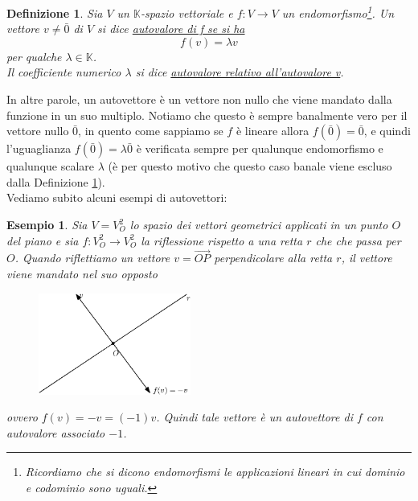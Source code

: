 \documentclass{book}
\newtheorem{definizione}{Definizione}[section]
\newtheorem{esempio}{Esempio}[section]
\begin{document}
\begin{definizione}
  \label{def:5.1.1}
  Sia $V$ un $\mathds{K}$-spazio vettoriale e $f: V\to V$ un endomorfismo\footnote{Ricordiamo che si dicono
    endomorfismi le applicazioni lineari in cui dominio e codominio sono uguali.}. Un vettore $v\neq \bar{0}$ di
  $V$ si dice \underline{autovalore di f se si ha}
  \begin{equation}
    \label{eq:5.1}
    f(v)=\lambda v
  \end{equation}
  per qualche $\lambda \in \mathds{K}$.\\
  Il coefficiente numerico $\lambda$ si dice \underline{autovalore relativo all'autovalore v}.
\end{definizione}
In altre parole, un autovettore è un vettore non nullo che viene mandato dalla funzione in un suo multiplo.
Notiamo che questo è sempre banalmente vero per il vettore nullo $\bar{0}$, in quento come sappiamo se $f$ è
lineare allora $f(\bar{0})=\bar{0}$, e quindi l'uguaglianza $f(\bar{0})=\lambda\bar{0}$ è verificata sempre per
qualunque endomorfismo e qualunque scalare $\lambda$ (è per questo motivo che questo caso banale viene escluso
dalla Definizione \ref{def:5.1.1}).\\
Vediamo subito alcuni esempi di autovettori:
\begin{esempio}
  \label{es:5.1.1}
  Sia $V=V_O^2$ lo spazio dei vettori geometrici applicati in un punto $O$ del piano e sia $f:V_O^2\to V_O^2$ la
  riflessione rispetto a una retta $r$ che che passa per $O$. Quando riflettiamo un vettore $v=\vec{OP}$
  perpendicolare alla retta $r$, il vettore viene mandato nel suo opposto 
  \begin{figure}[ht]
    \centering
    \includegraphics[width=5cm]{img/finiti/imgex5-1-1.eps}
  \end{figure}

  ovvero $f(v)=-v=(-1)v$. Quindi tale vettore è un autovettore di $f$ con autovalore associato $-1$.
\end{esempio}
\end{document}
